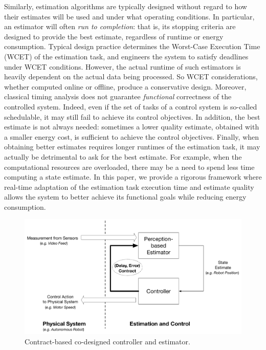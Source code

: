 Similarly, estimation algorithms are typically designed without regard to how their estimates will be used and under what operating conditions.
In particular, an estimator will often \emph{run to completion}: that is, its stopping criteria are designed to provide the best estimate, regardless of runtime or energy consumption.
Typical design practice determines the Worst-Case Execution Time (WCET) of the estimation task, and engineers the system to satisfy deadlines under WCET conditions.
However, the actual runtime of such estimators is heavily dependent on the actual data being processed. 
So WCET considerations, whether computed online or offline, produce a conservative design.
Moreover, classical timing analysis does not guarantee \emph{functional} correctness of the controlled system.
Indeed, even if the set of tasks of a control system is so-called schedulable, it may still fail to achieve its control objectives.
In addition, the best estimate is not always needed:
sometimes a lower quality estimate, obtained with a smaller energy cost, is sufficient to achieve the control objectives.
Finally, when obtaining better estimates requires longer runtimes of the estimation task, it may actually be detrimental to ask for the best estimate.
For example, when the computational resources are overloaded, there may be a need to spend less time computing a state estimate. 
In this paper, we provide a rigorous framework where real-time adaptation of the estimation task execution time and estimate quality allows the system to better achieve its functional goals while reducing energy consumption.
\begin{figure}[t]
	\centering
	\includegraphics[width=0.9\columnwidth]{figures/omnigraffle_figures/high_level_figure.pdf}
	\caption{Contract-based co-designed controller and estimator.}
	\label{fig:codesignedCE}
\end{figure}

